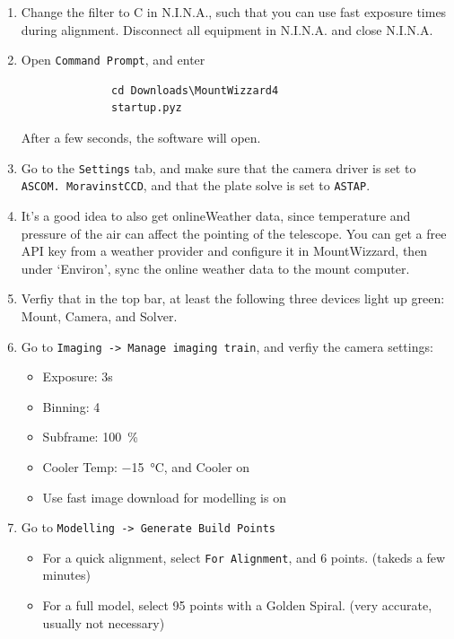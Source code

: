 \documentclass[a4paper, 11pt, fleqn]{memoir}
\begin{document}
\begin{enumerate}
    \item Change the filter to C in N.I.N.A., such that you can use fast exposure times during alignment. Disconnect all equipment in N.I.N.A. and close N.I.N.A.
    \item Open \texttt{Command Prompt}, and enter
          \begin{verbatim}
              cd Downloads\MountWizzard4
              startup.pyz
          \end{verbatim}
          After a few seconds, the software will open.
    \item
          Go to the \texttt{Settings} tab, and make sure that the camera driver is set to \texttt{ASCOM.
              MoravinstCCD}, and that the plate solve is set to \texttt{ASTAP}.
    \item It's a good idea to also get onlineWeather data, since temperature and pressure of the air can affect the pointing of the telescope. You can get a free API key from a weather provider and configure it in MountWizzard, then under `Environ', sync the online weather data to the mount computer.
    \item
          Verfiy that in the top bar, at least the following three devices light up green: Mount, Camera, and Solver.
    \item
          Go to \texttt{Imaging -> Manage imaging train}, and verfiy the camera settings:
          \begin{itemize}
              \item
                    Exposure: 3s
              \item
                    Binning: 4
              \item
                    Subframe: \SI{100}{\percent}
              \item
                    Cooler Temp: \SI{-15}{\celsius}, and Cooler on
              \item
                    Use fast image download for modelling is on
          \end{itemize}
    \item
          Go to \texttt{Modelling -> Generate Build Points}
          \begin{itemize}
              \item
                    For a quick alignment, select \texttt{For Alignment}, and 6 points. (takeds a few minutes)
              \item
                    For a full model, select 95 points with a Golden Spiral. (very accurate, usually not necessary)

\end{itemize}
\end{enumerate}
\end{document}
